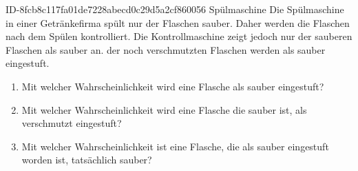 \begin{exercise}
      {ID-8fcb8c117fa01de7228abecd0c29d5a2cf860056}
      {Spülmaschine}
  \ifproblem\problem
    Die Spülmaschine in einer Getränkefirma spült nur  der Flaschen
    sauber. Daher werden die Flaschen nach dem Spülen kontrolliert. Die
    Kontrollmaschine zeigt jedoch nur  der sauberen Flaschen als
    sauber an.  der noch verschmutzten Flaschen werden als sauber
    eingestuft.
    \begin{enumerate}
      \item Mit welcher Wahrscheinlichkeit wird eine Flasche als sauber
            eingestuft?
      \item Mit welcher Wahrscheinlichkeit wird eine Flasche die sauber
            ist, als verschmutzt eingestuft?
      \item Mit welcher Wahrscheinlichkeit ist eine Flasche, die als
            sauber eingestuft worden ist, tatsächlich sauber?
    \end{enumerate}
  \fi
\end{exercise}
